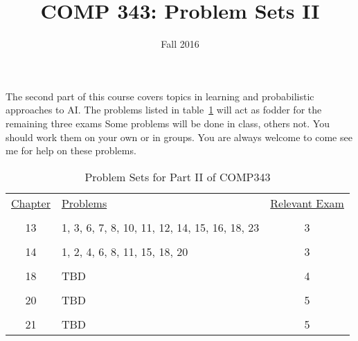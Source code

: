 \documentclass[nobib]{tufte-handout}
\title{COMP 343: Problem Sets II}
\author{  }
\date{Fall 2016}
\begin{document}
\maketitle

The second part of this course covers topics in learning and probabilistic approaches to AI\@.  The problems listed in table~\ref{probs} will act as fodder for the remaining three exams  Some problems will be done in class, others not. You should work them on your own or in groups. You are always welcome to come see me for help on these problems.

\begin{table}[!ht]
\begin{center}
\begin{tabular}{clc}
  \underline{Chapter} & \underline{Problems} & \underline{Relevant Exam} \\ \\
   13 & 1, 3, 6, 7, 8, 10, 11, 12, 14, 15, 16, 18, 23 & 3 \\ \\
   14 & 1, 2, 4, 6, 8, 11, 15, 18, 20 & 3 \\ \\
   18 & TBD & 4 \\ \\
   20 & TBD & 5 \\ \\
   21 & TBD & 5
\end{tabular}
\end{center}
\caption{Problem Sets for Part II of COMP343}
\label{probs}
\end{table}
\end{document}
